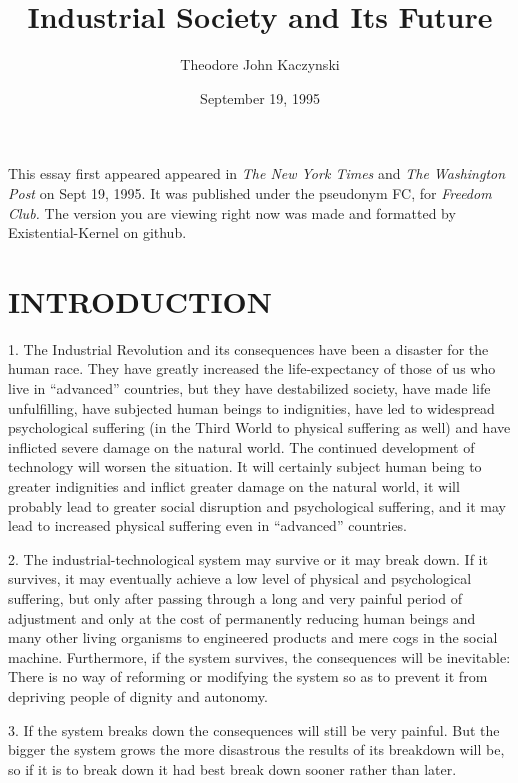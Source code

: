 \documentclass{article}
\title{Industrial Society and Its Future}
\author{\small{Theodore John Kaczynski}}
\date{\small{September 19, 1995}}
\begin{document}
\maketitle
\small{This essay first appeared appeared in \textit{The New York Times} and \textit{The Washington Post} on Sept 19, 1995. It was published under the pseudonym FC, for \textit{Freedom Club.} The version you are viewing right now was made and formatted by Existential-Kernel on github.}
\clearpage

\section{INTRODUCTION}
\hspace{0.5cm} 1. The Industrial Revolution and its consequences have been a disaster for the human race. They have greatly increased the life-expectancy of those of us who live in “advanced” countries, but they have destabilized society, have made life unfulfilling, have subjected human beings to indignities, have led to widespread psychological suffering (in the Third World to physical suffering as well) and have inflicted severe damage on the natural world. The continued 
development of technology will worsen the situation. It will certainly subject human being to greater indignities and inflict greater damage on the natural world, it will probably lead to greater 
social disruption and psychological suffering, and it may lead to increased physical suffering even 
in “advanced” countries. \vspace{\baselineskip}

2. The industrial-technological system may survive or it may break down. If it survives, it may 
eventually achieve a low level of physical and psychological suffering, but only after passing through a long and very painful period of adjustment and only at the cost of permanently reducing human beings and many other living organisms to engineered products and mere cogs in the social 
machine. Furthermore, if the system survives, the consequences will be inevitable: There is no way of reforming or modifying the system so as to prevent it from depriving people of dignity and 
autonomy. \vspace{\baselineskip}

3. If the system breaks down the consequences will still be very painful. But the bigger the system 
grows the more disastrous the results of its breakdown will be, so if it is to break down it had best 
break down sooner rather than later. \vspace{\baselineskip}
\end{document}
